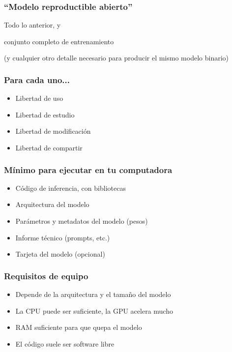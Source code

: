 \documentclass[17pt,aspectratio=169,hyperref={pdfusetitle,colorlinks,allcolors=olive}]{beamer}
\begin{document}
\begin{frame}[fragile]
\frametitle{``Modelo reproductible abierto''}

Todo lo anterior, y

\begin{center}
{\Large conjunto completo de entrenamiento}
\end{center}

(y cualquier otro detalle necesario para producir el mismo modelo binario)
\end{frame}

\begin{frame}[fragile]
\frametitle{Para cada uno...}

\begin{itemize}
\item Libertad de uso
\item Libertad de estudio
\item Libertad de modificación
\item Libertad de compartir
\end{itemize}
\end{frame}

\begin{frame}[fragile]
\frametitle{Mínimo para ejecutar en tu computadora}

\begin{itemize}
\item Código de inferencia, con bibliotecas
\item Arquitectura del modelo
\item Parámetros y metadatos del modelo (pesos)
\item Informe técnico (prompts, etc.)
\item Tarjeta del modelo (opcional)
\end{itemize}

\end{frame}

\begin{frame}[fragile]
\frametitle{Requisitos de equipo}

\begin{itemize}
\item Depende de la arquitectura y el tamaño del modelo
\item La CPU puede ser suficiente, la GPU acelera mucho
\item RAM suficiente para que quepa el modelo
\item El código suele ser software libre
\end{itemize}

\end{frame}
\end{document}
